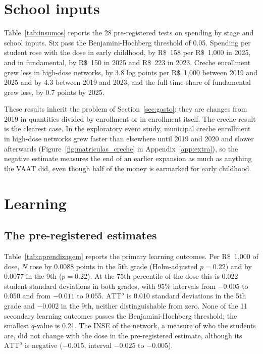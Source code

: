 \documentclass[11pt]{article}
\newcommand{\reais}{R\$}
\begin{document}
\section{School inputs}\label{sec:insumos}

Table~\ref{tab:insumos} reports the 28 pre-registered tests on spending by stage and school inputs. Six pass the Benjamini-Hochberg threshold of 0.05. Spending per student rose with the dose in early childhood, by \reais{}~158 per \reais{}~1,000 in 2025, and in fundamental, by \reais{}~150 in 2025 and \reais{}~223 in 2023. Creche enrollment grew less in high-dose networks, by 3.8 log points per \reais{}~1,000 between 2019 and 2025 and by 4.3 between 2019 and 2023, and the full-time share of fundamental grew less, by 0.7 points by 2025.

\begin{table}[t]
\centering
\caption{Spending by stage and school inputs (S2)}\label{tab:insumos}
\small

\end{table}

These results inherit the problem of Section~\ref{sec:gasto}: they are changes from 2019 in quantities divided by enrollment or in enrollment itself. The creche result is the clearest case. In the exploratory event study, municipal creche enrollment in high-dose networks grew faster than elsewhere until 2019 and 2020 and slower afterwards (Figure~\ref{fig:matriculas_creche} in Appendix~\ref{app:extra}), so the negative estimate measures the end of an earlier expansion as much as anything the VAAT did, even though half of the money is earmarked for early childhood.

\section{Learning}\label{sec:aprendizagem}

\subsection{The pre-registered estimates}

Table~\ref{tab:aprendizagem} reports the primary learning outcomes. Per \reais{}~1,000 of dose, $N$ rose by 0.0088 points in the 5th grade (Holm-adjusted $p=0.22$) and by 0.0077 in the 9th ($p=0.22$). At the 75th percentile of the dose this is 0.022 student standard deviations in both grades, with 95\% intervals from $-0.005$ to 0.050 and from $-0.011$ to 0.055. $\text{ATT}^o$ is 0.010 standard deviations in the 5th grade and $-0.002$ in the 9th, neither distinguishable from zero. None of the 11 secondary learning outcomes passes the Benjamini-Hochberg threshold; the smallest $q$-value is 0.21. The INSE of the network, a measure of who the students are, did not change with the dose in the pre-registered estimate, although its $\text{ATT}^o$ is negative ($-0.015$, interval $-0.025$ to $-0.005$).
\end{document}
